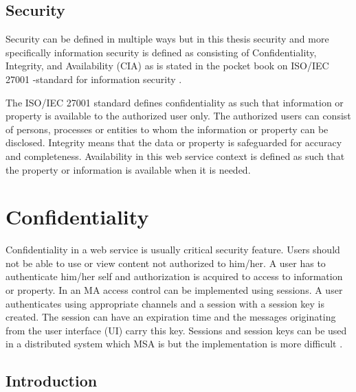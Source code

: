\subsection{Security}
\begin{sloppypar}
    Security can be defined in multiple ways but in this thesis security 
    and more specifically information security is defined as consisting of 
    Confidentiality, Integrity, and Availability (CIA) as is stated in the 
    pocket book on ISO/IEC 27001 -standard for information security \citep{isoiec27001}.

    The ISO/IEC 27001 standard defines confidentiality as such that information or property 
    is available to the authorized user only. The authorized users can consist of persons, 
    processes or entities to whom the information or property can be disclosed.
    Integrity means that the data or property is safeguarded for accuracy and completeness.
    Availability in this web service context is defined as such that the property or information 
    is available when it is needed.
    
\end{sloppypar}

\section{Confidentiality}
\begin{sloppypar}

    Confidentiality in a web service is usually critical security feature. 
    Users should not be able to use or view content not authorized to him/her. 
    A user has to authenticate him/her self and authorization is acquired to access to information or property.
    In an MA access control can be implemented using sessions. 
    A user authenticates using appropriate channels and a session with a session key is created. 
    The session can have an expiration time and the messages originating from 
    the user interface (UI) carry this key. Sessions and session keys can be used 
    in a distributed system which MSA is but the implementation is more difficult \citep{authinmsa}.
   

\end{sloppypar}



\subsection{Introduction}


